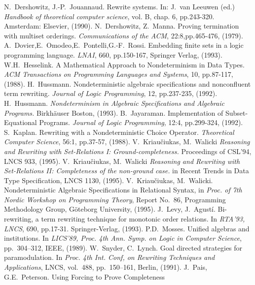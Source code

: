 \begin{thebibliography}{MM99}
 N.~Dershowitz, J.-P.~Jouannaud. 
   Rewrite systems. In: J.~van Leeuwen (ed.) 
   {\em Handbook of theoretical computer science}, vol. B,
   chap. 6, pp.243-320. Amsterdam: Elsevier, (1990).
 N.~Dershowitz, Z.~Manna. 
   Proving termination with multiset orderings. 
   {\em Communications of the ACM}, 22:8,pp.465-476, (1979).
 A.~Dovier,E.~Omodeo,E.~Pontelli,G.-F.~Rossi. 
   Embedding finite sets in a logic programming language. 
   {\em LNAI}, 660, pp.150-167, Springer Verlag, (1993).
 W.H.~Hesselink. A Mathematical Approach to Nondeterminism
   in Data Types. {\em ACM Transactions on Programming Languages and Systems},
   10, pp.87-117, (1988).
 H.~Hussmann. Nondeterministic algebraic
   specifications and nonconfluent term rewriting. {\em Journal of Logic
   Programming}, 12, pp.237-235, (1992).
 H.~Hussmann. 
   {\em Nondeterminism in Algebraic Specifications and Algebraic Programs.}
   Birkh\"auser Boston, (1993).
 B.~Jayaraman. Implementation of Subset-Equational 
   Programs. {\em Journal of Logic Programming}, 12:4, pp.299-324, (1992).
 S.~Kaplan. Rewriting with a Nondeterministic Choice
   Operator. {\it Theoretical Computer Science}, 56:1, pp.37-57, (1988).
 V.~Kriau\v ciukas, M.~Walicki
   {\em Reasoning and Rewriting with Set-Relations I: Ground-completeness.}
   Proceedings of CSL'94, LNCS 933, (1995).
 V.~Kriau\v ciukas, M.~Walicki
   {\em Reasoning and Rewriting with Set-Relations II: Completeness of the non-ground case.}
   in Recent Trends in Data Type Specification, LNCS 1130, (1995).
V.~Kriau\v ciukas, M.~Walicki.
   Nondeterministic Algebraic Specifications in Relational Syntax, in
   {\it Proc. of 7th Nordic Workshop on Programming Theory}, Report
   No.~86, Programming Methodology Group, G\"oteborg University, (1995).
 J.~Levy, J.~Agust\'i. Bi-rewriting, a term rewriting
   technique for monotonic order relations. In {\em RTA'93, LNCS}, 
   690, pp.17-31. Springer-Verlag, (1993).
 P.D.~Mosses. Unified algebras and institutions. In
   {\it LICS'89, Proc. 4th Ann. Symp. on Logic in Computer Science},
   pp.~304--312, IEEE, (1989).
 W.~Snyder, C.~Lynch. Goal directed strategies for
   paramodulation. In {\it Proc. 4th Int. Conf, on Rewriting Techniques and
   Applications}, LNCS, vol.~488, pp.~150--161,
   Berlin, (1991).
 J.~Pais, G.E.~Peterson. Using Forcing to Prove Completeness

\end{thebibliography}
